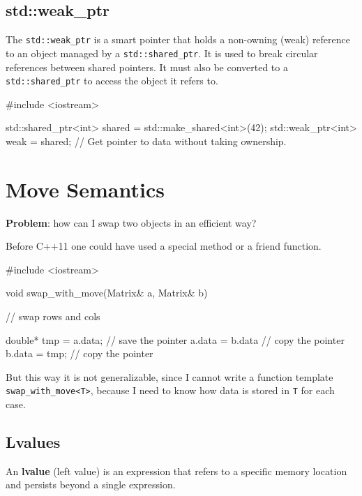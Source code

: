 \subsection{std::weak\_ptr}
The \texttt{std::weak\_ptr} is a smart pointer that holds a non-owning (weak) reference to an object
managed by a \texttt{std::shared\_ptr}. It is used to break circular references between shared pointers.
It must also be converted to a \texttt{std::shared\_ptr} to access the object it refers to.

\begin{exampleblock}
    \begin{codeblock}[language=C++]
#include <iostream>

std::shared_ptr<int> shared = std::make_shared<int>(42);
std::weak_ptr<int> weak = shared;  // Get pointer to data without taking ownership.
    \end{codeblock}
\end{exampleblock}



\section{Move Semantics}

\textbf{Problem}: how can I swap two objects in an efficient way?

Before C++11 one could have used a special method or a friend function. 

\begin{exampleblock}
    \begin{codeblock}[language=C++]
#include <iostream>

void swap_with_move(Matrix& a, Matrix& b) {
    // swap rows and cols 

    double* tmp = a.data; // save the pointer 
    a.data = b.data // copy the pointer
    b.data = tmp; // copy the pointer
}
    \end{codeblock}
\end{exampleblock}

But this way it is not generalizable, since I cannot write a function template \texttt{swap\_with\_move<T>}, because I need to know how data is stored in \texttt{T} for each case.

\subsection*{Lvalues}
\begin{definitionblock}
    An \textbf{lvalue} (left value) is an expression that refers to a specific memory location and persists beyond a single expression.
\end{definitionblock}

